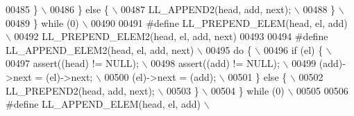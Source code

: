 \begin{DoxyCode}
00485 \textcolor{preprocessor}{  \}                                                                                            \(\backslash\)}
00486 \textcolor{preprocessor}{ \} else \{                                                                                      \(\backslash\)}
00487 \textcolor{preprocessor}{  LL\_APPEND2(head, add, next);                                                                 \(\backslash\)}
00488 \textcolor{preprocessor}{ \}                                                                                             \(\backslash\)}
00489 \textcolor{preprocessor}{\} while (0)                                                                                    \(\backslash\)}
00490 \textcolor{preprocessor}{}
00491 \textcolor{preprocessor}{#define LL\_PREPEND\_ELEM(head, el, add)                                                         \(\backslash\)}
00492 \textcolor{preprocessor}{    LL\_PREPEND\_ELEM2(head, el, add, next)}
00493 
00494 \textcolor{preprocessor}{#define LL\_APPEND\_ELEM2(head, el, add, next)                                                   \(\backslash\)}
00495 \textcolor{preprocessor}{do \{                                                                                           \(\backslash\)}
00496 \textcolor{preprocessor}{ if (el) \{                                                                                     \(\backslash\)}
00497 \textcolor{preprocessor}{  assert((head) != NULL);                                                                      \(\backslash\)}
00498 \textcolor{preprocessor}{  assert((add) != NULL);                                                                       \(\backslash\)}
00499 \textcolor{preprocessor}{  (add)->next = (el)->next;                                                                    \(\backslash\)}
00500 \textcolor{preprocessor}{  (el)->next = (add);                                                                          \(\backslash\)}
00501 \textcolor{preprocessor}{ \} else \{                                                                                      \(\backslash\)}
00502 \textcolor{preprocessor}{  LL\_PREPEND2(head, add, next);                                                                \(\backslash\)}
00503 \textcolor{preprocessor}{ \}                                                                                             \(\backslash\)}
00504 \textcolor{preprocessor}{\} while (0)                                                                                    \(\backslash\)}
00505 \textcolor{preprocessor}{}
00506 \textcolor{preprocessor}{#define LL\_APPEND\_ELEM(head, el, add)                                                          \(\backslash\)}

\end{DoxyCode}
